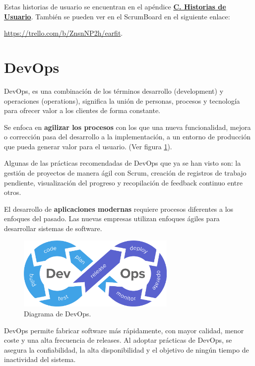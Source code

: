 \documentclass[12pt,twoside,titlepage]{report}
\begin{document}
Estas historias de usuario se encuentran en el apéndice \hyperref[sec:UserStories]{\textbf{C. Historias de Usuario}}. También se pueden ver en el ScrumBoard en el siguiente enlace: 

\url{https://trello.com/b/ZnsnNP2h/earfit}.


\section{DevOps}
\label{sec:DevOps}

DevOps, es una combinación de los términos desarrollo (development) y operaciones (operations), significa la unión de personas, procesos y tecnología para ofrecer valor a los clientes de forma constante.

Se enfoca en \textbf{agilizar los procesos} con los que una nueva funcionalidad, mejora o corrección pasa del desarrollo a la implementación, a un entorno de producción que pueda generar valor para el usuario.
(Ver figura \ref{fig:DevOps}).

Algunas de las prácticas recomendadas de DevOps que ya se han visto son: la gestión de proyectos de manera ágil con Scrum, creación de registros de trabajo pendiente, visualización del progreso y recopilación de feedback continuo entre otros.

El desarrollo de \textbf{aplicaciones modernas} requiere procesos diferentes a los enfoques del pasado. Las nuevas empresas utilizan enfoques ágiles para desarrollar sistemas de software.
\cite{devops1}

\begin{figure}[H]
    \centering
    \includegraphics[width=0.68\textwidth]{DevOps/DevOps}
    \caption{Diagrama de DevOps.}
    \label{fig:DevOps}
\end{figure}

DevOps permite fabricar software más rápidamente, con mayor calidad, menor coste y una alta frecuencia de releases. Al adoptar prácticas de DevOps, se asegura la confiabilidad, la alta disponibilidad y el objetivo de ningún tiempo de inactividad del sistema.
\end{document}
